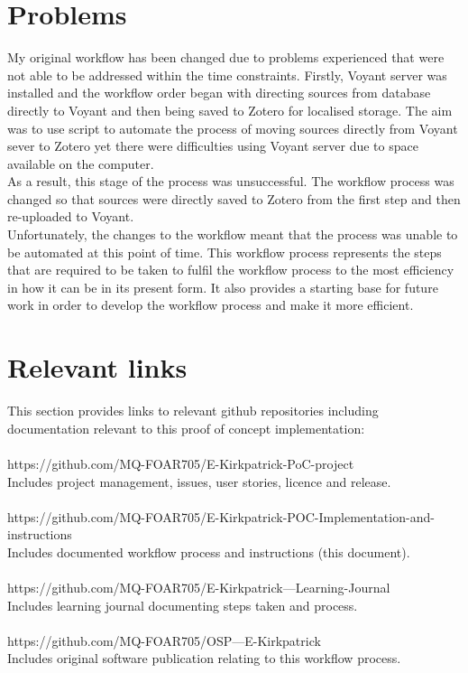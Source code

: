 \documentclass{article}
\begin{document}
\section{Problems}
My original workflow has been changed due to problems experienced that were not able to be addressed within the time constraints. Firstly, Voyant server was installed and the workflow order began with directing sources from database directly to Voyant and then being saved to Zotero for localised storage. The aim was to use script to automate the process of moving sources directly from Voyant sever to Zotero yet there were difficulties using Voyant server due to space available on the computer.\\
As a result, this stage of the process was unsuccessful. The workflow process was changed so that sources were directly saved to Zotero from the first step and then re-uploaded to Voyant. \\
Unfortunately, the changes to the workflow meant that the process was unable to be automated at this point of time. This workflow process represents the steps that are required to be taken to fulfil the workflow process to the most efficiency in how it can be in its present form. It also provides a starting base for future work in order to develop the workflow process and make it more efficient.\\

\section{Relevant links}
This section provides links to relevant github repositories including documentation relevant to this proof of concept implementation:\\
\\
https://github.com/MQ-FOAR705/E-Kirkpatrick-PoC-project\\
Includes project management, issues, user stories, licence and release.\\
\\
https://github.com/MQ-FOAR705/E-Kirkpatrick-POC-Implementation-and-instructions\\
Includes documented workflow process and instructions (this document).\\
\\
https://github.com/MQ-FOAR705/E-Kirkpatrick---Learning-Journal\\
Includes learning journal documenting steps taken and process.\\
\\
https://github.com/MQ-FOAR705/OSP---E-Kirkpatrick\\
Includes original software publication relating to this workflow process.
\end{document}
